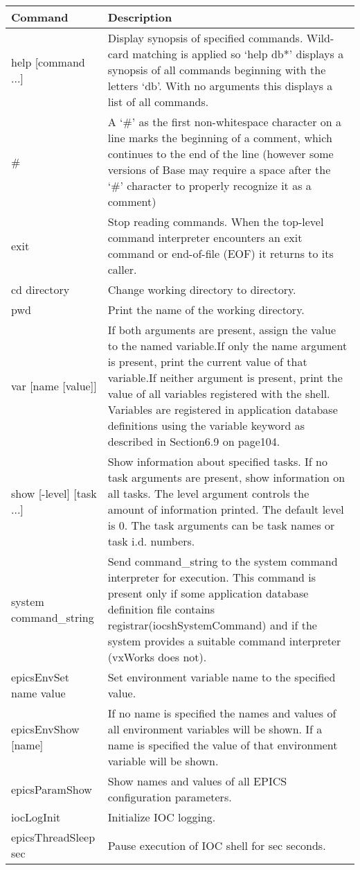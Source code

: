 \begin{center}
\begin{longtable}{p{1.59082in}p{5.21418in}}
Command & Description\\
\hline
help [command ...] & Display synopsis of specified commands.  Wild-card matching is applied so `help db*' displays a synopsis of all commands beginning with the letters `db'. With no arguments this displays a list of all commands.\\
\# & A `\#' as the first non-whitespace character on a line marks the beginning of a comment, which continues to the end of the line (however some versions of Base may require a space after the `\#' character to properly recognize it as a comment)\\
exit & Stop reading commands. When the top-level command interpreter encounters an exit command or end-of-file (EOF) it returns to its caller.\\
cd directory & Change working directory to directory.\\
pwd & Print the name of the working directory.\\
var [name [value]] & If both arguments are present, assign the value to the named variable.If only the name argument is present, print the current value of that variable.If neither argument is present, print the value of all variables registered with the shell.  Variables are registered in application database definitions using the variable keyword as described in Section6.9 on page104.\\
show [-level] [task ...] & Show information about specified tasks.  If no task arguments are present, show information on all tasks.  The level argument controls the amount of information printed.  The default level is 0.  The task arguments can be task names or task i.d. numbers.\\
system command\_string & Send command\_string to the system command interpreter for execution.  This command is present only if some application database definition file contains registrar(iocshSystemCommand) and if the system provides a suitable command interpreter (vxWorks does not).\\
epicsEnvSet name value & Set environment variable name to the specified value.\\
epicsEnvShow  [name] & If no name is specified the names and values of all environment variables will be shown. If a name is specified the value of that environment variable will be shown.\\
epicsParamShow & Show names and values of all EPICS configuration parameters.\\
iocLogInit & Initialize IOC logging.\\
epicsThreadSleep sec & Pause execution of IOC shell for sec seconds.
\end{longtable}

\end{center}

